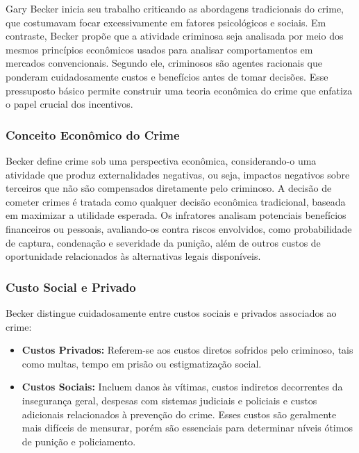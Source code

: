 \documentclass[a4paper,12pt]{article}[abntex2]
\begin{document}
Gary Becker inicia seu trabalho criticando as abordagens tradicionais do crime, que costumavam focar excessivamente em fatores psicológicos e sociais. Em contraste, Becker propõe que a atividade criminosa seja analisada por meio dos mesmos princípios econômicos usados para analisar comportamentos em mercados convencionais. Segundo ele, criminosos são agentes racionais que ponderam cuidadosamente custos e benefícios antes de tomar decisões. Esse pressuposto básico permite construir uma teoria econômica do crime que enfatiza o papel crucial dos incentivos.

\subsubsection{\textbf{Conceito Econômico do Crime}}

Becker define crime sob uma perspectiva econômica, considerando-o uma atividade que produz externalidades negativas, ou seja, impactos negativos sobre terceiros que não são compensados diretamente pelo criminoso. A decisão de cometer crimes é tratada como qualquer decisão econômica tradicional, baseada em maximizar a utilidade esperada. Os infratores analisam potenciais benefícios financeiros ou pessoais, avaliando-os contra riscos envolvidos, como probabilidade de captura, condenação e severidade da punição, além de outros custos de oportunidade relacionados às alternativas legais disponíveis.

\subsubsection{\textbf{Custo Social e Privado}}

Becker distingue cuidadosamente entre custos sociais e privados associados ao crime:

\begin{itemize}
    \item \textbf{Custos Privados:} Referem-se aos custos diretos sofridos pelo criminoso, tais como multas, tempo em prisão ou estigmatização social.
    \item \textbf{Custos Sociais:} Incluem danos às vítimas, custos indiretos decorrentes da insegurança geral, despesas com sistemas judiciais e policiais e custos adicionais relacionados à prevenção do crime. Esses custos são geralmente mais difíceis de mensurar, porém são essenciais para determinar níveis ótimos de punição e policiamento.
\end{itemize}
\end{document}
